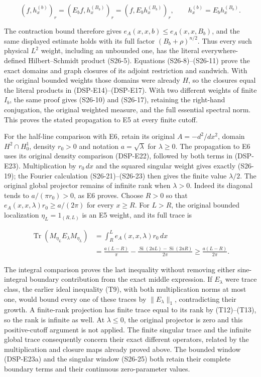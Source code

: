 \documentclass[
  11pt,
]{article}
\begin{document}
\[
 (f,h_x^{(b)})_r
 =(E_bf,h_x^{(B_b)})_r
 =(f,E_bh_x^{(B_b)})_r,
 \qquad h_x^{(b)}=E_bh_x^{(B_b)}.
\]

The contraction bound therefore gives \(e_A(x,x,b)\le e_A(x,x,B_b)\),
and the same displayed estimate holds with its full factor
\((B_b+\rho)^{n/2}\). Thus every such physical \(L^2\) weight, including
an unbounded one, has the literal everywhere-defined Hilbert--Schmidt
product (S26-5). Equations (S26-8)--(S26-11) prove the exact domains and
graph closures of its adjoint restriction and sandwich. With the
original bounded weights those domains were already \(H\), so the
closures equal the literal products in (DSP-E14)--(DSP-E17). With two
different weights of finite \(I_b\), the same proof gives (S26-10) and
(S26-17), retaining the right-hand conjugation, the original weighted
measure, and the full essential spectral norm. This proves the stated
propagation to E5 at every finite cutoff.

For the half-line comparison with E6, retain its original
\(A=-d^2/dx^2\), domain \(H^2\cap H_0^1\), density \(r_0>0\) and
notation \(a=\sqrt\lambda\) for \(\lambda\ge0\). The propagation to E6
uses its original density comparison (DSP-E22), followed by both terms
in (DSP-E23). Multiplication by \(r_0\,dx\) and the squared singular
weight gives exactly (S26-19); the Fourier calculation
(S26-21)--(S26-23) then gives the finite value \(\lambda/2\). The
original global projector remains of infinite rank when \(\lambda>0\).
Indeed its diagonal tends to \(a/(\pi r_0)>0\), as E6 proves. Choose
\(R>0\) so that \(e_A(x,x,\lambda)r_0\ge a/(2\pi)\) for every
\(x\ge R\). For \(L>R\), the original bounded localization
\(\eta_L=1_{(R,L)}\) is an E5 weight, and its full trace is

\[
 \begin{aligned}
 \operatorname{Tr}(M_{\eta_L}E_\lambda M_{\eta_L})
 &=\int_R^L e_A(x,x,\lambda)r_0\,dx\\
 &=\frac{a(L-R)}{\pi}
   -\frac{\operatorname{Si}(2aL)-\operatorname{Si}(2aR)}{2\pi}
 \ge\frac{a(L-R)}{2\pi}.
 \end{aligned}
\]

The integral comparison proves the last inequality without removing
either sine-integral boundary contribution from the exact middle
expression. If \(E_\lambda\) were trace class, the earlier ideal
inequality (T9), with both multiplication norms at most one, would bound
every one of these traces by \(\|E_\lambda\|_1\), contradicting their
growth. A finite-rank projection has finite trace equal to its rank by
(T12)--(T13), so the rank is infinite as well. At \(\lambda\le0\), the
original projector is zero and this positive-cutoff argument is not
applied. The finite singular trace and the infinite global trace
consequently concern their exact different operators, related by the
multiplication and closure maps already proved above. The bounded window
(DSP-E23a) and the singular window (S26-25) both retain their complete
boundary terms and their continuous zero-parameter values.
\end{document}
